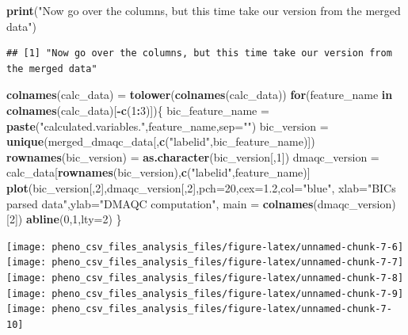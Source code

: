 \documentclass[]{article}
\newenvironment{Shaded}{\begin{snugshade}}{\end{snugshade}}
\newcommand{\KeywordTok}[1]{\textcolor[rgb]{0.13,0.29,0.53}{\textbf{#1}}}
\newcommand{\DataTypeTok}[1]{\textcolor[rgb]{0.13,0.29,0.53}{#1}}
\newcommand{\DecValTok}[1]{\textcolor[rgb]{0.00,0.00,0.81}{#1}}
\newcommand{\FloatTok}[1]{\textcolor[rgb]{0.00,0.00,0.81}{#1}}
\newcommand{\StringTok}[1]{\textcolor[rgb]{0.31,0.60,0.02}{#1}}
\newcommand{\ControlFlowTok}[1]{\textcolor[rgb]{0.13,0.29,0.53}{\textbf{#1}}}
\newcommand{\OperatorTok}[1]{\textcolor[rgb]{0.81,0.36,0.00}{\textbf{#1}}}
\newcommand{\NormalTok}[1]{#1}
\begin{document}
\begin{Shaded}
\begin{Highlighting}[]
\KeywordTok{print}\NormalTok{(}\StringTok{"Now go over the columns, but this time take our version from the merged data"}\NormalTok{)}
\end{Highlighting}
\end{Shaded}

\begin{verbatim}
## [1] "Now go over the columns, but this time take our version from the merged data"
\end{verbatim}

\begin{Shaded}
\begin{Highlighting}[]
\KeywordTok{colnames}\NormalTok{(calc_data) =}\StringTok{ }\KeywordTok{tolower}\NormalTok{(}\KeywordTok{colnames}\NormalTok{(calc_data))}
\ControlFlowTok{for}\NormalTok{(feature_name }\ControlFlowTok{in} \KeywordTok{colnames}\NormalTok{(calc_data)[}\OperatorTok{-}\KeywordTok{c}\NormalTok{(}\DecValTok{1}\OperatorTok{:}\DecValTok{3}\NormalTok{)])\{}
\NormalTok{  bic_feature_name =}\StringTok{ }\KeywordTok{paste}\NormalTok{(}\StringTok{"calculated.variables."}\NormalTok{,feature_name,}\DataTypeTok{sep=}\StringTok{""}\NormalTok{)}
\NormalTok{  bic_version =}\StringTok{ }\KeywordTok{unique}\NormalTok{(merged_dmaqc_data[,}\KeywordTok{c}\NormalTok{(}\StringTok{"labelid"}\NormalTok{,bic_feature_name)])}
  \KeywordTok{rownames}\NormalTok{(bic_version) =}\StringTok{ }\KeywordTok{as.character}\NormalTok{(bic_version[,}\DecValTok{1}\NormalTok{])}
\NormalTok{  dmaqc_version =}\StringTok{ }\NormalTok{calc_data[}\KeywordTok{rownames}\NormalTok{(bic_version),}\KeywordTok{c}\NormalTok{(}\StringTok{"labelid"}\NormalTok{,feature_name)]}
  \KeywordTok{plot}\NormalTok{(bic_version[,}\DecValTok{2}\NormalTok{],dmaqc_version[,}\DecValTok{2}\NormalTok{],}\DataTypeTok{pch=}\DecValTok{20}\NormalTok{,}\DataTypeTok{cex=}\FloatTok{1.2}\NormalTok{,}\DataTypeTok{col=}\StringTok{"blue"}\NormalTok{,}
       \DataTypeTok{xlab=}\StringTok{"BICs parsed data"}\NormalTok{,}\DataTypeTok{ylab=}\StringTok{"DMAQC computation"}\NormalTok{,}
       \DataTypeTok{main =} \KeywordTok{colnames}\NormalTok{(dmaqc_version)[}\DecValTok{2}\NormalTok{])}
  \KeywordTok{abline}\NormalTok{(}\DecValTok{0}\NormalTok{,}\DecValTok{1}\NormalTok{,}\DataTypeTok{lty=}\DecValTok{2}\NormalTok{)}
\NormalTok{\}}
\end{Highlighting}
\end{Shaded}

\texttt{[image: pheno\_csv\_files\_analysis\_files/figure-latex/unnamed-chunk-7-6]}
\texttt{[image: pheno\_csv\_files\_analysis\_files/figure-latex/unnamed-chunk-7-7]}
\texttt{[image: pheno\_csv\_files\_analysis\_files/figure-latex/unnamed-chunk-7-8]}
\texttt{[image: pheno\_csv\_files\_analysis\_files/figure-latex/unnamed-chunk-7-9]}
\texttt{[image: pheno\_csv\_files\_analysis\_files/figure-latex/unnamed-chunk-7-10]}
\end{document}
